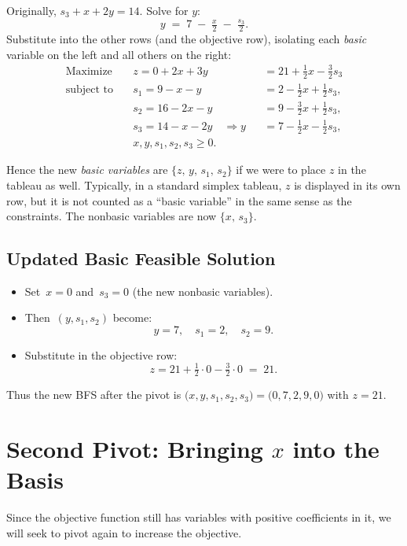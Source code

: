 Originally, \(s_3 + x + 2y = 14\).  Solve for \(y\):
\[
y \;=\; 7 \;-\; \tfrac{x}{2} \;-\; \tfrac{s_3}{2}.
\]
Substitute into the other rows (and the objective row), isolating each \emph{basic} variable on the left and all others on the right:
\[
\begin{aligned}
\text{Maximize}\quad 
& z = 0+ 2x + 3y \quad && = 21 + \frac{1}{2}x - \frac{3}{2}s_3 \\
\text{subject to}\quad 
& s_1 = 9 - x - y \quad && = 2 - \frac{1}{2}x + \frac{1}{2}s_3, \\
& s_2 = 16 - 2x - y \quad &&= 9 - \frac{3}{2}x + \frac{1}{2}s_3, \\
& s_3 = 14 - x - 2y \quad \Rightarrow y &&= 7 - \frac{1}{2}x - \frac{1}{2}s_3, \\
& x, y, s_1, s_2, s_3 \ge 0.
\end{aligned}
\]



\noindent
Hence the new \emph{basic variables} are \(\{z,\,y,\,s_1,\,s_2\}\) if we were to place \(z\) in the tableau as well.  Typically, in a standard simplex tableau, \(z\) is displayed in its own row, but it is not counted as a “basic variable” in the same sense as the constraints.  The nonbasic variables are now \(\{x,\,s_3\}\).

\subsection*{Updated Basic Feasible Solution}

\begin{itemize}
  \item Set \(\,x=0\) and \(\,s_3=0\) (the new nonbasic variables). 
  \item Then \(\,(y,s_1,s_2)\) become:
  \[
  y = 7, 
  \quad
  s_1 = 2,
  \quad
  s_2 = 9.
  \]
  \item Substitute in the objective row:
  \[
  z = 21 + \tfrac12\cdot 0 - \tfrac32\cdot 0 \;=\; 21.
  \]
\end{itemize}
Thus the new BFS after the pivot is 
\(\bigl(x,y,s_1,s_2,s_3\bigr) = \bigl(0,7,2,9,0\bigr)\) 
with \(z=21\).

\section*{Second Pivot: Bringing \(x\) into the Basis}
Since the objective function still has variables with positive coefficients in it, we will seek to pivot again to increase the objective.


